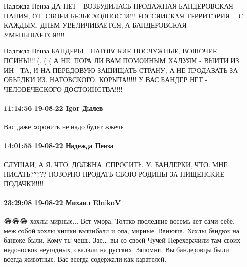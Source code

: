 Надежда Пенза
ДА НЕТ - ВОЗБУДИЛАСЬ ПРОДАЖНАЯ БАНДЕРОВСКАЯ НАЦИЯ, ОТ. СВОЕИ БЕЗЫСХОДНОСТИ!!!
РОССИИСКАЯ ТЕРРИТОРИЯ - -С КАЖДЫМ. ДНЕМ УВЕЛИЧИВАЕТСЯ, А БАНДЕРОВСКАЯ УМЕНЬШАЕТСЯ!!!!

Надежда Пенза
БАНДЕРЫ - НАТОВСКИЕ ПОСЛУЖНЫЕ, ВОНЮЧИЕ. ПСИНЫ!!! (. ( ( А НЕ. ПОРА ЛИ ВАМ ПОМОИНЫМ ХАЛУЯМ - ВЫИТИ ИЗ ИН - ТА, И НА ПЕРЕДОВУЮ ЗАЩИЩАТЬ СТРАНУ, А НЕ ПРОДАВАТЬ ЗА ОБЬЕДКИ ИЗ. НАТОВСКОГО. КОРЫТА!!!!! У ВАС БАНДЕР НЕТ - ЧЕЛОВЕЧЕСКОГО ДОСТОИНСТВА!!!!

\paragraph{11:14:56 19-08-22 Igor Дылев}

Вас даже хоронить не надо будет жжечь

\paragraph{14:01:55 19-08-22 Надежда Пенза}

СЛУШАИ, А Я. ЧТО. ДОЛЖНА. СПРОСИТЬ. У. БАНДЕРКИ, ЧТО. МНЕ ПИСАТЬ????? ПОЗОРНО
ПРОДАТЬ СВОЮ РОДИНЫ ЗА НИЩЕНСКИЕ ПОДАЧКИ!!!!

\paragraph{23:29:08 19-08-22 Михаил ElnikoV}

😂😂😂 хохлы мирные... Вот умора. Толтко последние восемь лет сами себе, меж собой хохлы кишки вышибали и опа, мирные.
Ванюша. Хохлы бандюк на банюке были. Кому ты чешь.
Зае... вы со своей Чучей
Перехерачили там своих недоносков неугодных, свалили на русских.
Запомни. Вы бандеровцы были всегда животные. Вас всегда содержали как карателей.
